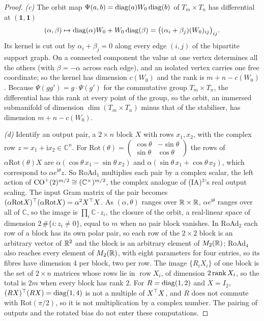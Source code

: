\begin{proof}
\emph{(c)} The orbit map $\Psi(a,b)=\operatorname{diag}(a)W_0\operatorname{diag}(b)$ of $T_m\times T_n$ has differential at $(\mathbf 1,\mathbf 1)$
\begin{equation*}
  (\alpha,\beta)\mapsto\operatorname{diag}(\alpha)W_0+W_0\operatorname{diag}(\beta)=\big((\alpha_i+\beta_j)(W_0)_{ij}\big)_{ij}.
\end{equation*}
Its kernel is cut out by $\alpha_i+\beta_j=0$ along every edge $(i,j)$ of the bipartite support graph. On a connected
component the value at one vertex determines all the others (with $\beta=-\alpha$ across each edge), and an isolated
vertex carries one free coordinate; so the kernel has dimension $c(W_0)$ and the rank is $m+n-c(W_0)$. Because
$\Psi(g g')=g\cdot\Psi(g')$ for the commutative group $T_m\times T_n$, the differential has this rank at every point of the
group, so the orbit, an immersed submanifold of dimension $\dim(T_m\times T_n)$ minus that of the stabiliser, has
dimension $m+n-c(W_0)$.

\emph{(d)} Identify an output pair, a $2\times n$ block $X$ with rows $x_1,x_2$, with the complex row $z=x_1+\mathrm ix_2\in
\mathbb C^n$. For $\mathrm{Rot}(\theta)=\left(\begin{smallmatrix}\cos\theta&-\sin\theta\\ \sin\theta&\cos\theta\end{smallmatrix}
\right)$ the rows of $\alpha\mathrm{Rot}(\theta)X$ are $\alpha(\cos\theta\,x_1-\sin\theta\,x_2)$ and
$\alpha(\sin\theta\,x_1+\cos\theta\,x_2)$, which correspond to $\alpha e^{\mathrm i\theta}z$. So RoAd$_1$ multiplies each pair
by a complex scalar, the left action of $\mathrm{CO}^+(2)^{m/2}\cong(\mathbb C^\times)^{m/2}$, the complex analogue of (IA)$^3$'s
real output scaling. The input Gram matrix of the pair becomes
$(\alpha\mathrm{Rot}X)^{\top}(\alpha\mathrm{Rot}X)=\alpha^2X^{\top} X$. As $(\alpha,\theta)$ ranges over $\mathbb{R}\times\mathbb{R}$, $\alpha e^{\mathrm i\theta}$
ranges over all of $\mathbb C$, so the image is $\prod_i\mathbb C\cdot z_i$, the closure of the orbit, a real-linear space of
dimension $2\,\#\{i:z_i\ne0\}$, equal to $m$ when no pair block vanishes. In RoAd$_2$ each row of a block has its own
polar pair, so each row of the $2\times2$ block is an arbitrary vector of $\mathbb{R}^2$ and the block is an arbitrary element of
$M_2(\mathbb{R})$; RoAd$_4$ also reaches every element of $M_2(\mathbb{R})$, with eight parameters for four entries, so its fibres have
dimension $4$ per block, two per row. The image $\{R_iX_i\}$ of one block is the set of $2\times n$ matrices whose rows lie
in $\operatorname{row}X_i$, of dimension $2\operatorname{rank} X_i$, so the total is $2m$ when every block has rank $2$. For $R=\operatorname{diag}(1,2)$
and $X=I_2$, $(RX)^{\top}(RX)=\operatorname{diag}(1,4)$ is not a multiple of $X^{\top} X$, and $R$ does not commute with $\mathrm{Rot}(\pi/2)$, so it
is not multiplication by a complex number. The pairing of outputs and the rotated bias do not enter these computations.


\end{proof}
